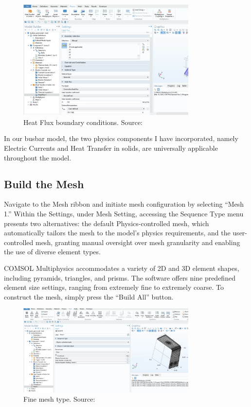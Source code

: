 \begin{figure}[H]
  \centering
  \includegraphics[width=0.8\textwidth]{Chapters/Figures/Chapter 3 Figures/Heat Flux Boundary Conditions.png}
  \caption{Heat Flux boundary conditions. Source: \cite{multiphysics__modeling_nodate}}
  \label{fig:Heat Flux boundary conditions.}
\end{figure}

In our busbar model, the two physics components I have incorporated, namely Electric Currents and Heat Transfer in solids, are universally applicable throughout the model.

\subsection{Build the Mesh}
Navigate to the Mesh ribbon and initiate mesh configuration by selecting ``Mesh 1.'' Within the Settings, under Mesh Setting, accessing the Sequence Type menu presents two alternatives: the default Physics-controlled mesh, which automatically tailors the mesh to the model's physics requirements, and the user-controlled mesh, granting manual oversight over mesh granularity and enabling the use of diverse element types.

COMSOL Multiphysics accommodates a variety of 2D and 3D element shapes, including pyramids, triangles, and prisms. The software offers nine predefined element size settings, ranging from extremely fine to extremely coarse. To construct the mesh, simply press the ``Build All'' button.

\begin{figure}[H]
  \centering
  \includegraphics[width=0.8\textwidth]{Chapters/Figures/Chapter 3 Figures/Fine Mesh.png}
  \caption{Fine mesh type. Source: \cite{multiphysics__modeling_nodate}}
  \label{fig:Fine mesh type.}
\end{figure}

